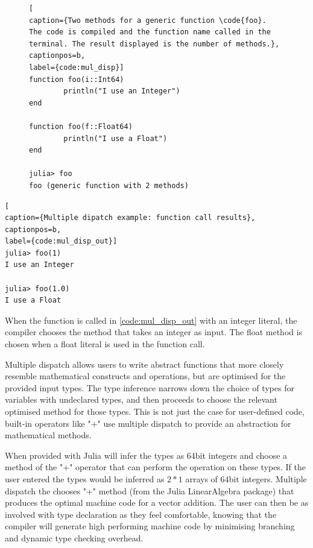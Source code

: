 \begin{figure}[htb!]
\begin{lstlisting}[
caption={Two methods for a generic function \code{foo}. 
The code is compiled and the function name called in the terminal. The result displayed is the number of methods.},
captionpos=b, 
label={code:mul_disp}]
function foo(i::Int64)
        println("I use an Integer")
end

function foo(f::Float64)
        println("I use a Float")
end

julia> foo
foo (generic function with 2 methods)
\end{lstlisting}
\end{figure}


\begin{lstlisting}[
caption={Multiple dipatch example: function call results},
captionpos=b, 
label={code:mul_disp_out}]
julia> foo(1)
I use an Integer

julia> foo(1.0)
I use a Float
\end{lstlisting}

When the function is called in \ref{code:mul_disp_out} with an integer literal, the compiler chooses the method that takes an integer as input. The float method is chosen when a float literal is used in the function call.

Multiple dispatch allows users to write abstract functions that more closely resemble mathematical constructs and operations, but are optimised for the provided input types. The type inference narrows down the choice of types for variables with undeclared types, and then proceeds to choose the relevant optimised method for those types. This is not just the case for user-defined code, built-in operators like "+" use multiple dispatch to provide an abstraction for mathematical methods.

When provided with  Julia will infer the types as 64bit integers and choose a method of the "+" operator that can perform the operation on these types. If the user entered  the types would be inferred as $2 * 1$ arrays of 64bit integers. Multiple dispatch the chooses "+" method (from the Julia LinearAlgebra package) that produces the optimal machine code for a vector addition. The user can then be as involved with type declaration as they feel comfortable, knowing that the compiler will generate high performing machine code by minimising branching and dynamic type checking overhead.

\pagebreak

